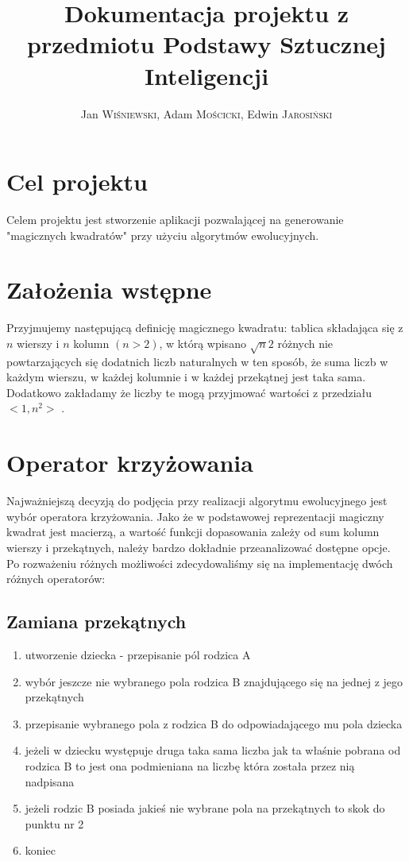 \documentclass[a4paper,twoside,10pt]{article}
\author{Jan \textsc{Wiśniewski}, Adam \textsc{Mościcki}, Edwin \textsc{Jarosiński}}
\title{Dokumentacja projektu z przedmiotu Podstawy Sztucznej Inteligencji}
\begin{document}
\maketitle
 
\section{Cel projektu}
	Celem projektu jest stworzenie aplikacji pozwalającej na generowanie "magicznych kwadratów" przy użyciu algorytmów ewolucyjnych.
\section{Założenia wstępne}
	Przyjmujemy następującą definicję magicznego kwadratu:
 tablica składająca się z $ n $ wierszy i $ n $ kolumn $ (n>2) $, w którą wpisano $ \sqrt{n}{2} $ różnych nie powtarzających się dodatnich liczb naturalnych w ten sposób, że suma liczb w każdym wierszu, w każdej kolumnie i w każdej przekątnej jest taka sama. Dodatkowo zakładamy że liczby te mogą przyjmować wartości z przedziału $ <1,n^2> $	.
	
\section{Operator krzyżowania}
	Najważniejszą decyzją do podjęcia przy realizacji algorytmu ewolucyjnego jest wybór operatora krzyżowania. Jako że w podstawowej reprezentacji magiczny kwadrat jest macierzą, a wartość funkcji dopasowania zależy od sum kolumn wierszy i przekątnych, należy bardzo dokładnie przeanalizować dostępne opcje. Po rozważeniu różnych możliwości zdecydowaliśmy się na implementację dwóch różnych operatorów:
		\subsection{Zamiana przekątnych}
		\begin{enumerate}
			\item utworzenie dziecka - przepisanie pól rodzica A
			\item wybór jeszcze nie wybranego pola rodzica B znajdującego się na jednej z jego przekątnych
			\item przepisanie wybranego pola z rodzica B do odpowiadającego mu pola dziecka
			\item jeżeli w dziecku występuje druga taka sama liczba jak ta właśnie pobrana od rodzica B to jest ona podmieniana na liczbę która została przez nią nadpisana
			\item jeżeli rodzic B posiada jakieś nie wybrane pola na przekątnych to skok do punktu nr 2
			\item koniec
		\end{enumerate}
\end{document}
